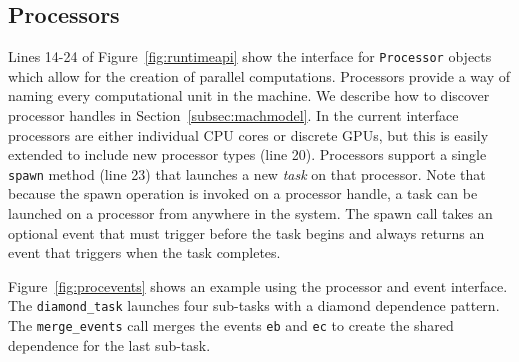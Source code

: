 \subsection{Processors}
\label{subsec:procs}
Lines 14-24 of Figure~\ref{fig:runtimeapi} show the interface for {\tt Processor} objects which allow for
the creation of parallel computations.  Processors provide a way of naming 
every computational unit in the machine.  We describe how to discover processor handles
in Section~\ref{subsec:machmodel}.  In the current interface 
processors are either individual CPU cores or discrete GPUs, but this is easily extended
to include new processor types (line 20).   Processors support a single {\tt spawn}
method (line 23) that launches a new {\em task} on that processor.
Note that because the spawn operation
is invoked on a processor handle, a task can be launched on a 
processor from anywhere in the system.  
The spawn call takes an optional event that must trigger before the task begins and
always returns an event that triggers when the task completes.

Figure~\ref{fig:procevents} shows an example using 
the processor and event interface.  The {\tt diamond\_task} launches four
sub-tasks with a diamond dependence pattern.
The {\tt merge\_events} call
merges the events {\tt eb} and {\tt ec} to create the shared dependence
for the last sub-task.

